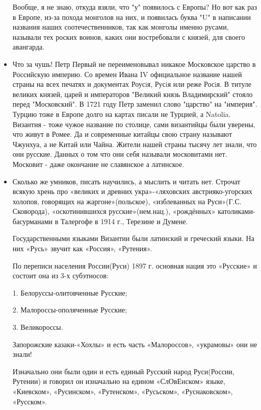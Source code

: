 \begin{itemize}
Вообще, я не знаю, откуда взяли, что "у" появилось с Европы? Но вот как раз в
Европе, из-за похода монголов на них, и появилась буква "U" в написании
названия наших соотечественников, так как монголы именно русами, называли тех
роских воинов, каких они востребовали с князей, для своего авангарда.

\item {}

Что за чушь! Петр Первый не переименовывал никакое Московское царство в
Российскую империю. Со времен Ивана IV официальное название нашей страны на
всех печатях и документах Роусiя, Русiя или реже Росiя. В титуле великих
князей, царей и императоров "Великий князь Владимирский" стояло перед
"Московский". В 1721 году Петр заменил слово "царство" на "империя". Турцию
тоже в Европе долго на картах писали не Турцией, а Natolia. Византия - тоже
чужое название по столице, сами византийцы были уверены, что живут в Ромее. Да
и современные китайцы свою страну называют Чжунхуа, а не Китай или Чайна.
Жители нашей страны тысячу лет знали, что они русские. Данных о том что они
себя называли московитами нет. Московит - даже окончание не славянское а
латинское.

\item {}

Сколько же умников, писать научились, а мыслить и читать нет. Строчат
всякую хрень про «великих и древних укра»-«ляховских австрияко-угорских
холопов, говорящих на жаргоне»(польское), «изблеванных на Руси»(Г.С.
Сковорода), «оскотинившихся русские»(нем.нац.), «рождённых»
католиками-басурманами в Талергофе в 1914 г., Терезине и Думене.

Государственными языками Византии были латинский и греческий языки. На них
«Русь» звучит как «Россия», «Рутения».

По переписи населения России(Руси) 1897 г. основная нация это «Русские» и
состоит она из 3-х субэтносов:

1. Белоруссы-олитовченные Русские;

2. Малороссы-ополяченные Русские;

3. Великороссы.

Запорожские казаки-«Хохлы» и есть часть «Малороссов», «украмовы» они не знали!

Изначально они были один и есть единый Русский народ Руси(России, Рутении) и
говорил он изначально на едином «СлОвЕнском» языке, «Киевском», «Русинском»,
«Рутенском», «Русьском», «Руснаковском», «Русском».


\end{itemize}

